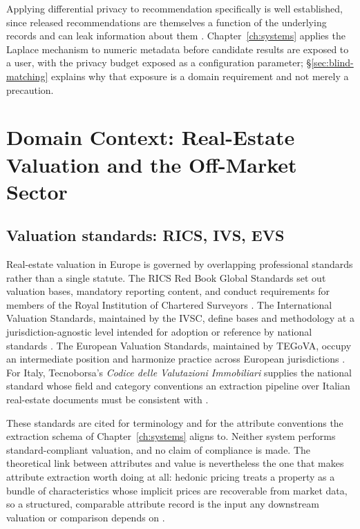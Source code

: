 Applying differential privacy to recommendation specifically is well established, since released recommendations are themselves a function of the underlying records and can leak information about them \citep{mcsherry2009differentially}. Chapter~\ref{ch:systems} applies the Laplace mechanism to numeric metadata before candidate results are exposed to a user, with the privacy budget exposed as a configuration parameter; \S\ref{sec:blind-matching} explains why that exposure is a domain requirement and not merely a precaution.

\section{Domain Context: Real-Estate Valuation and the Off-Market Sector}
\label{sec:domain-context}

\subsection{Valuation standards: RICS, IVS, EVS}
\label{sec:valuation-standards}

Real-estate valuation in Europe is governed by overlapping professional standards rather than a single statute. The RICS Red Book Global Standards set out valuation bases, mandatory reporting content, and conduct requirements for members of the Royal Institution of Chartered Surveyors \citep{royalinstitutionofcharteredsurveyors2024rics}. The International Valuation Standards, maintained by the IVSC, define bases and methodology at a jurisdiction-agnostic level intended for adoption or reference by national standards \citep{internationalvaluationstandardscouncil2024international}. The European Valuation Standards, maintained by TEGoVA, occupy an intermediate position and harmonize practice across European jurisdictions \citep{tegova2025european}. For Italy, Tecnoborsa's \emph{Codice delle Valutazioni Immobiliari} supplies the national standard whose field and category conventions an extraction pipeline over Italian real-estate documents must be consistent with \citep{tecnoborsa2025codice}.

These standards are cited for terminology and for the attribute conventions the extraction schema of Chapter~\ref{ch:systems} aligns to. Neither system performs standard-compliant valuation, and no claim of compliance is made. The theoretical link between attributes and value is nevertheless the one that makes attribute extraction worth doing at all: hedonic pricing treats a property as a bundle of characteristics whose implicit prices are recoverable from market data, so a structured, comparable attribute record is the input any downstream valuation or comparison depends on \citep{rosen1974hedonic}.

